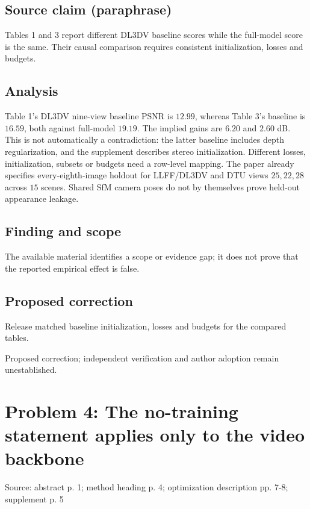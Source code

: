 \documentclass[11pt]{article}
\begin{document}
\subsection*{Source claim (paraphrase)}

Tables 1 and \(3\) report different DL3DV baseline scores while the full-model score is the same. Their causal comparison requires consistent initialization, losses and budgets.

\subsection*{Analysis}

Table 1's DL3DV nine-view baseline PSNR is \(12.99\), whereas Table 3's baseline is \(16.59\), both against full-model \(19.19\). The implied gains are \(6.20\) and \(2.60\) dB. This is not automatically a contradiction: the latter baseline includes depth regularization, and the supplement describes stereo initialization. Different losses, initialization, subsets or budgets need a row-level mapping. The paper already specifies every-eighth-image holdout for LLFF/DL3DV and DTU views \(25,22,28\) across \(15\) scenes. Shared SfM camera poses do not by themselves prove held-out appearance leakage.

\subsection*{Finding and scope}

The available material identifies a scope or evidence gap; it does not prove that the reported empirical effect is false.

\subsection*{Proposed correction}

Release matched baseline initialization, losses and budgets for the compared tables.

Proposed correction; independent verification and author adoption remain unestablished.

\section*{Problem 4: The no-training statement applies only to the video backbone}

Source: abstract p. 1; method heading p. 4; optimization description pp. 7-8; supplement p. 5
\end{document}
